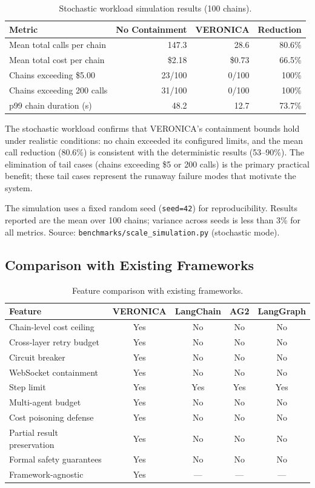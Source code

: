 \documentclass[11pt]{article}
\begin{document}
\begin{table}[!ht]
\centering
\caption{Stochastic workload simulation results (100 chains).}
\label{tab:stochastic}
\begin{tabular}{@{}lrrr@{}}
\toprule
\textbf{Metric} & \textbf{No Containment} & \textbf{VERONICA} &
\textbf{Reduction} \\
\midrule
Mean total calls per chain & 147.3 & 28.6 & 80.6\% \\
Mean total cost per chain & \$2.18 & \$0.73 & 66.5\% \\
Chains exceeding \$5.00 & 23/100 & 0/100 & 100\% \\
Chains exceeding 200 calls & 31/100 & 0/100 & 100\% \\
p99 chain duration (s) & 48.2 & 12.7 & 73.7\% \\
\bottomrule
\end{tabular}
\end{table}

The stochastic workload confirms that VERONICA's containment bounds hold under
realistic conditions: no chain exceeded its configured limits, and the mean
call reduction (80.6\%) is consistent with the deterministic results
(53--90\%). The elimination of tail cases (chains exceeding \$5 or 200 calls)
is the primary practical benefit; these tail cases represent the runaway
failure modes that motivate the system.

The simulation uses a fixed random seed (\texttt{seed=42}) for
reproducibility. Results reported are the mean over 100 chains; variance
across seeds is less than 3\% for all metrics. Source:
\texttt{benchmarks/scale\_simulation.py} (stochastic mode).

\subsection{Comparison with Existing Frameworks}

\begin{table}[!ht]
\centering
\footnotesize
\caption{Feature comparison with existing frameworks.}
\label{tab:comparison}
\begin{tabular}{@{}lcccc@{}}
\toprule
\textbf{Feature} & \textbf{VERONICA} & \textbf{LangChain} & \textbf{AG2} &
\textbf{LangGraph} \\
\midrule
Chain-level cost ceiling & Yes & No & No & No \\
Cross-layer retry budget & Yes & No & No & No \\
Circuit breaker & Yes & No & No & No \\
WebSocket containment & Yes & No & No & No \\
Step limit & Yes & Yes & Yes & Yes \\
Multi-agent budget & Yes & No & No & No \\
Cost poisoning defense & Yes & No & No & No \\
Partial result preservation & Yes & No & No & No \\
Formal safety guarantees & Yes & No & No & No \\
Framework-agnostic & Yes & --- & --- & --- \\
\bottomrule
\end{tabular}
\end{table}
\end{document}
